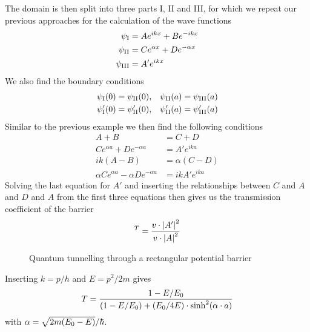 \documentclass[../../script.tex]{subfiles}
\begin{document}
The domain is then split into three parts I, II and III, for which we repeat our previous approaches for the calculation of the wave functions 
\begin{equation}
	\begin{split}
		\wave[I] &= Ae^{ikx} + Be^{-ikx} \\
		\wave[II] &= Ce^{\alpha x} + De^{-\alpha x} \\
		\wave[III] &= A'e^{ikx}
	\end{split}
\end{equation}
We also find the boundary conditions 
\begin{align}
	\wave[I](0) &= \wave[II](0), & \wave[II](a) &= \wave[III](a) \nonumber \\
	\wave[I]'(0) &= \wave[II]'(0), & \wave[II]'(a) &= \wave[III]'(a)
\end{align}
Similar to the previous example we then find the following conditions 
\begin{align*}
	A + B &= C + D \\
	Ce^{\alpha a} + De^{-\alpha a} &= A'e^{ika} \\
	ik(A - B) &= \alpha (C - D) \\
	\alpha Ce^{\alpha a} - \alpha D e^{-\alpha a} &= ikA' e^{ika}
\end{align*}
Solving the last equation for $A'$ and inserting the relationships between $C$ and $A$ and $D$ and $A$ from the first three equations then gives us the transmission coefficient of the barrier
\begin{equation}
	^T = \frac{v \cdot \abs{A'}^2}{v \cdot \abs{A}^2}
\end{equation}

\begin{figure}
	\begin{center}
	\end{center}

	\caption{Quantum tunnelling through a rectangular potential barrier}
	\label{fig:quantumtunnelling}
\end{figure}

Inserting $k = p/h$ and $E = p^2/2m$ gives
\begin{equation}
	T = \frac{1 - E/E_{\text{0}}}{(1 - E/E_{\text{0}}) + (E_{\text{0}} / 4E) \cdot \sinh^2(\alpha \cdot a)}
\end{equation}
with $\alpha = \sqrt{2m(E_{\text{0}} - E)}/\hbar$.
\end{document}
